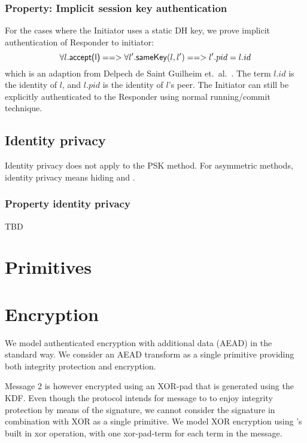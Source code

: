 \subsubsection{Property: Implicit session key authentication}
\label{sec:mail-notes-session-key-imp-auth}
%

For the cases where the Initiator uses a static DH key, we prove implicit
authentication of Responder to initiator:
$$
\forall l. \text{\textup{\textsf{accept(l)}}} ==>
    \forall l'. \text{\textup{\textsf{sameKey}}}(l, l') ==> l'.pid = l.id
$$
which is an adaption from Delpech de Saint Guilheim
et.~al.~\cite{DBLP:journals/iacr/GuilhemFW19}.
%
The term $l.id$ is the identity of $l$, and $l.pid$ is the identity of $l$'s
peer.
%
The Initiator can still be explicitly authenticated to the Responder using
normal running/commit technique.
%



\subsection{Identity privacy}
%
Identity privacy does not apply to the PSK method.
%
For asymmetric methods, identity privacy means hiding  and
.

\subsubsection{Property identity privacy}
TBD

\section{Primitives}
\section{Encryption}
\label{sec:mail-notes-encr}
%
We model authenticated encryption with additional data (AEAD) in the standard
way.
%
We consider an AEAD transform as a single primitive providing both integrity
protection and encryption.
%

Message 2 is however encrypted using an XOR-pad that is generated using the KDF.
%
Even though the protocol intends for message to to enjoy integrity protection by
means of the signature, we cannot consider the signature in combination with
XOR as a single primitive.
%
We model XOR encryption using \mTamarin's built in xor operation, with one
xor-pad-term for each term in the message.
%
